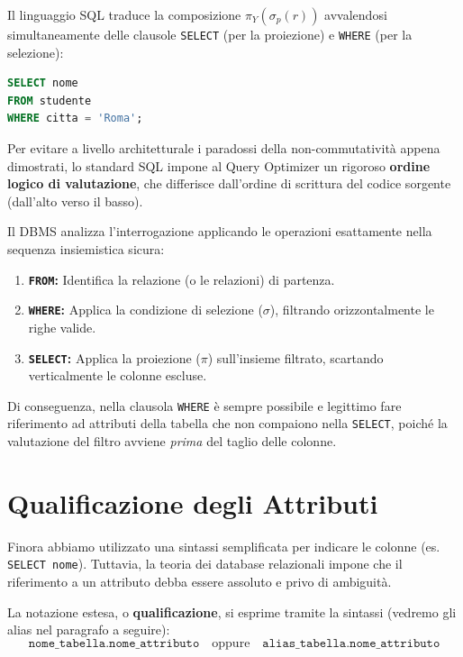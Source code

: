 Il linguaggio SQL traduce la composizione $\pi_Y(\sigma_p(r))$ avvalendosi simultaneamente delle clausole \texttt{SELECT} (per la proiezione) e \texttt{WHERE} (per la selezione):

\begin{lstlisting}[language=SQL, basicstyle=\ttfamily\small, keywordstyle=\color{blue}\bfseries]
SELECT nome 
FROM studente 
WHERE citta = 'Roma';
\end{lstlisting}

Per evitare a livello architetturale i paradossi della non-commutatività appena dimostrati, lo standard SQL impone al Query Optimizer un rigoroso \textbf{ordine logico di valutazione}, che differisce dall'ordine di scrittura del codice sorgente (dall'alto verso il basso). 

Il DBMS analizza l'interrogazione applicando le operazioni esattamente nella sequenza insiemistica sicura:
\begin{enumerate}
    \item \textbf{\texttt{FROM}:} Identifica la relazione (o le relazioni) di partenza.
    \item \textbf{\texttt{WHERE}:} Applica la condizione di selezione ($\sigma$), filtrando orizzontalmente le righe valide.
    \item \textbf{\texttt{SELECT}:} Applica la proiezione ($\pi$) sull'insieme filtrato, scartando verticalmente le colonne escluse.
\end{enumerate}
Di conseguenza, nella clausola \texttt{WHERE} è sempre possibile e legittimo fare riferimento ad attributi della tabella che non compaiono nella \texttt{SELECT}, poiché la valutazione del filtro avviene \textit{prima} del taglio delle colonne.

\section{Qualificazione degli Attributi}

Finora abbiamo utilizzato una sintassi semplificata per indicare le colonne (es. \texttt{SELECT nome}). Tuttavia, la teoria dei database relazionali impone che il riferimento a un attributo debba essere assoluto e privo di ambiguità. 

La notazione estesa, o \textbf{qualificazione}, si esprime tramite la sintassi (vedremo gli alias nel paragrafo a seguire):
$$ \texttt{nome\_tabella.nome\_attributo} \quad \text{oppure} \quad \texttt{alias\_tabella.nome\_attributo} $$

